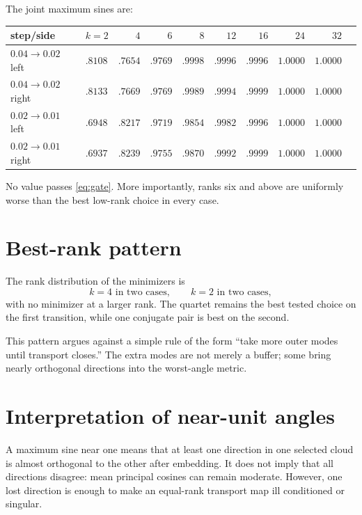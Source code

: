\documentclass[12pt]{article}
\theoremstyle{remark}\newtheorem{remark}[theorem]{Remark}
\begin{document}
The joint maximum sines are:
\begin{center}
\scriptsize
\begin{tabular}{llrrrrrrrr}
\toprule
step/side & $k=2$ & $4$ & $6$ & $8$ & $12$ & $16$ & $24$ & $32$\\
\midrule
$0.04\to0.02$ left
& $.8108$ & $.7654$ & $.9769$ & $.9998$ & $.9996$ & $.9996$ & $1.0000$ & $1.0000$\\
$0.04\to0.02$ right
& $.8133$ & $.7669$ & $.9769$ & $.9989$ & $.9994$ & $.9999$ & $1.0000$ & $1.0000$\\
$0.02\to0.01$ left
& $.6948$ & $.8217$ & $.9719$ & $.9854$ & $.9982$ & $.9996$ & $1.0000$ & $1.0000$\\
$0.02\to0.01$ right
& $.6937$ & $.8239$ & $.9755$ & $.9870$ & $.9992$ & $.9999$ & $1.0000$ & $1.0000$\\
\bottomrule
\end{tabular}
\end{center}
No value passes \eqref{eq:gate}.  More importantly, ranks six and above are
uniformly worse than the best low-rank choice in every case.

\section{Best-rank pattern}

The rank distribution of the minimizers is
\begin{equation*}
 k=4\text{ in two cases},\qquad
 k=2\text{ in two cases},
\end{equation*}
with no minimizer at a larger rank.  The quartet remains the best tested
choice on the first transition, while one conjugate pair is best on the
second.

This pattern argues against a simple rule of the form ``take more outer
modes until transport closes.''  The extra modes are not merely a buffer;
some bring nearly orthogonal directions into the worst-angle metric.

\section{Interpretation of near-unit angles}

A maximum sine near one means that at least one direction in one selected
cloud is almost orthogonal to the other after embedding.  It does not imply
that all directions disagree: mean principal cosines can remain moderate.
However, one lost direction is enough to make an equal-rank transport map
ill conditioned or singular.
\end{document}
